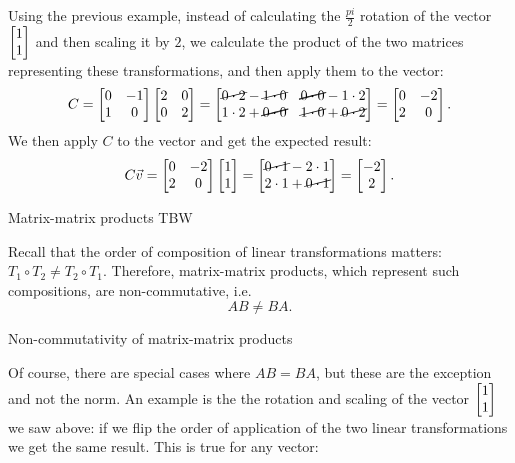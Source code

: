 Using the previous example, instead of calculating the $\frac{pi}{2}$ rotation of the vector $\colvec{1;1}$ and then scaling it by $2$, we calculate the product of the two matrices representing these transformations, and then apply them to the vector:
\[
	C=\begin{bmatrix} 0 & -1\\1 & 0 \end{bmatrix}\begin{bmatrix} 2 & 0\\0 & 2 \end{bmatrix} =
	\begin{bmatrix}
		\cancel{0\cdot2}-\cancel{1\cdot0} & \cancel{\cancel{0\cdot0}}-1\cdot2\\
		1\cdot2+\cancel{\cancel{0\cdot0}} & \cancel{1\cdot0}+\cancel{0\cdot2}
		\end{bmatrix} = \begin{bmatrix} 0 & -2\\2 & 0 \end{bmatrix}.
\]
We then apply $C$ to the vector and get the expected result:
\[
	C\vec{v} = \begin{bmatrix} 0 & -2\\2 & 0 \end{bmatrix} \colvec{1;1} = \colvec{\cancel{0\cdot1}-2\cdot1;2\cdot1+\cancel{0\cdot1}} = \colvec{-2;2}.
\]

\begin{example}{Matrix-matrix products}{}
	TBW
\end{example}

Recall that the order of composition of linear transformations matters: $T_{1}\circ T_{2} \neq T_{2}\circ T_{1}$. Therefore, matrix-matrix products, which represent such compositions, are non-commutative, i.e.
\begin{equation}
	AB\neq BA.
	\label{eq:matrix_matrix_product_non_commutative}
\end{equation}

\begin{example}{Non-commutativity of matrix-matrix products}{}
	
\end{example}

Of course, there are special cases where $AB=BA$, but these are the exception and not the norm. An example is the the rotation and scaling of the vector $\colvec{1;1}$ we saw above: if we flip the order of application of the two linear transformations we get the same result. This is true for any vector:

